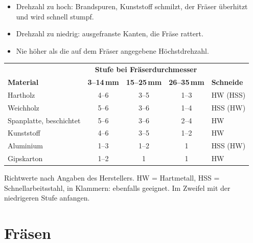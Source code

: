 \documentclass{\basedir/fablab-document}
\begin{document}
	\begin{itemize}
		\item Drehzahl zu hoch: Brandspuren, Kunststoff schmilzt, der Fräser überhitzt und wird schnell stumpf.
		\item Drehzahl zu niedrig: ausgefranste Kanten, die Fräse rattert.
		\item Nie höher als die auf dem Fräser angegebene Höchstdrehzahl.
	\end{itemize}

	\begin{center}
		\small
		\renewcommand{\arraystretch}{1.3}
		\begin{tabularx}{\textwidth}{|X|c|c|c|l|}
			\hline
			& \multicolumn{3}{c|}{\textbf{Stufe bei Fräserdurchmesser}} & \\
			\textbf{Material} & \textbf{3--14\,mm} & \textbf{15--25\,mm} & \textbf{26--35\,mm} & \textbf{Schneide} \\ \hline
			Hartholz & 4--6 & 3--5 & 1--3 & HW (HSS) \\ \hline
			Weichholz & 5--6 & 3--6 & 1--4 & HSS (HW) \\ \hline
			Spanplatte, beschichtet & 5--6 & 3--6 & 2--4 & HW \\ \hline
			Kunststoff & 4--6 & 3--5 & 1--2 & HW \\ \hline
			Aluminium & 1--3 & 1--2 & 1 & HSS (HW) \\ \hline
			Gipskarton & 1--2 & 1 & 1 & HW \\ \hline
		\end{tabularx}
	\end{center}

	{\footnotesize Richtwerte nach Angaben des Herstellers. HW = Hartmetall, HSS = Schnellarbeitsstahl, in Klammern: ebenfalls geeignet. Im Zweifel mit der niedrigeren Stufe anfangen.}

	\section{Fräsen}
\end{document}
